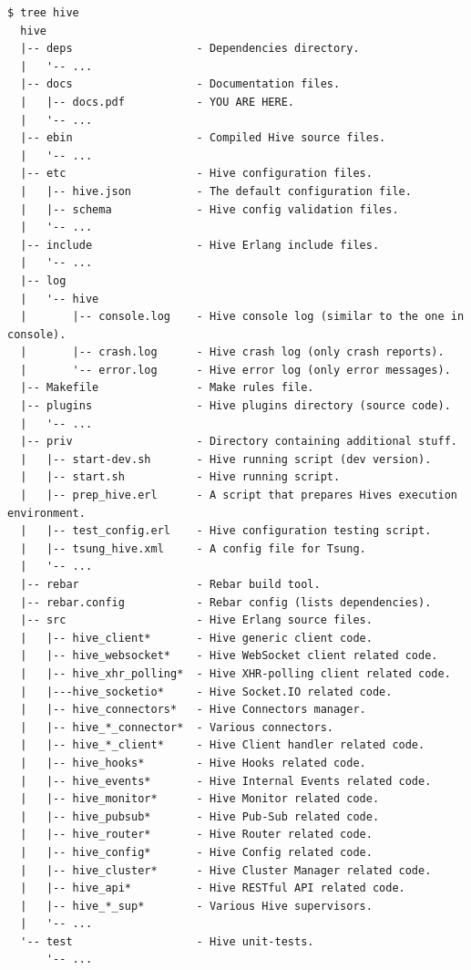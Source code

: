 \documentclass[a4paper]{article}
\begin{document}
\begin{verbatim}
$ tree hive
  hive
  |-- deps                   - Dependencies directory.
  |   '-- ...
  |-- docs                   - Documentation files.
  |   |-- docs.pdf           - YOU ARE HERE.
  |   '-- ...
  |-- ebin                   - Compiled Hive source files.
  |   '-- ...
  |-- etc                    - Hive configuration files.
  |   |-- hive.json          - The default configuration file.
  |   |-- schema             - Hive config validation files.
  |   '-- ...
  |-- include                - Hive Erlang include files.
  |   '-- ...
  |-- log
  |   '-- hive
  |       |-- console.log    - Hive console log (similar to the one in console).
  |       |-- crash.log      - Hive crash log (only crash reports).
  |       '-- error.log      - Hive error log (only error messages).
  |-- Makefile               - Make rules file.
  |-- plugins                - Hive plugins directory (source code).
  |   '-- ...
  |-- priv                   - Directory containing additional stuff.
  |   |-- start-dev.sh       - Hive running script (dev version).
  |   |-- start.sh           - Hive running script.
  |   |-- prep_hive.erl      - A script that prepares Hives execution environment.
  |   |-- test_config.erl    - Hive configuration testing script.
  |   |-- tsung_hive.xml     - A config file for Tsung.
  |   '-- ...
  |-- rebar                  - Rebar build tool.
  |-- rebar.config           - Rebar config (lists dependencies).
  |-- src                    - Hive Erlang source files.
  |   |-- hive_client*       - Hive generic client code.
  |   |-- hive_websocket*    - Hive WebSocket client related code.
  |   |-- hive_xhr_polling*  - Hive XHR-polling client related code.
  |   |---hive_socketio*     - Hive Socket.IO related code.
  |   |-- hive_connectors*   - Hive Connectors manager.
  |   |-- hive_*_connector*  - Various connectors.
  |   |-- hive_*_client*     - Hive Client handler related code.
  |   |-- hive_hooks*        - Hive Hooks related code.
  |   |-- hive_events*       - Hive Internal Events related code.
  |   |-- hive_monitor*      - Hive Monitor related code.
  |   |-- hive_pubsub*       - Hive Pub-Sub related code.
  |   |-- hive_router*       - Hive Router related code.
  |   |-- hive_config*       - Hive Config related code.
  |   |-- hive_cluster*      - Hive Cluster Manager related code.
  |   |-- hive_api*          - Hive RESTful API related code.
  |   |-- hive_*_sup*        - Various Hive supervisors.
  |   '-- ...
  '-- test                   - Hive unit-tests.
      '-- ...
\end{verbatim}
\end{document}
